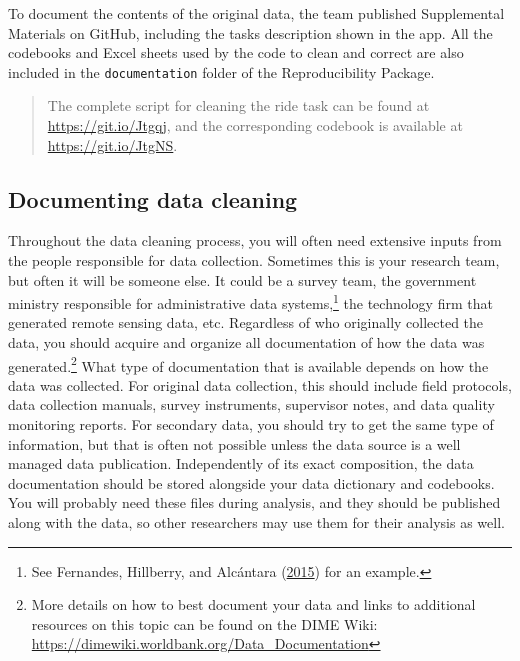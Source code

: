 \documentclass[
]{book}
\begin{document}
\begin{ex}
To document the contents of the original data, the team published Supplemental Materials on GitHub, including the tasks description shown in the app. All the codebooks and Excel sheets used by the code to clean and correct are also included in the \texttt{documentation} folder of the Reproducibility Package.

\begin{quote}
The complete script for cleaning the ride task can be found at \url{https://git.io/Jtgqj}, and the corresponding codebook is available at \url{https://git.io/JtgNS}.
\end{quote}
\end{ex}

\hypertarget{documenting-data-cleaning}{%
\subsection*{Documenting data cleaning}\label{documenting-data-cleaning}}

Throughout the data cleaning process,
you will often need extensive inputs from the people responsible for data collection.
Sometimes this is your research team, but often it will be someone else.
It could be a survey team, the government ministry responsible for administrative data systems,\footnote{See Fernandes, Hillberry, and Alcántara (\protect\hyperlink{ref-fernandes2015trade}{2015}) for an example.}
the technology firm that generated remote sensing data, etc.
Regardless of who originally collected the data,
you should acquire and organize all documentation of how the data was generated.\footnote{More details on how to best document your data and
  links to additional resources on this topic can be found on the DIME Wiki:
  \url{https://dimewiki.worldbank.org/Data_Documentation}}
What type of documentation that is available depends on how the data was collected.
For original data collection, this should include
field protocols, data collection manuals, survey instruments,
supervisor notes, and data quality monitoring reports.
For secondary data, you should try to get the same type of information,
but that is often not possible unless
the data source is a well managed data publication.
Independently of its exact composition,
the data documentation should be stored
alongside your data dictionary and codebooks.
You will probably need these files during analysis,
and they should be published along with the data,
so other researchers may use them for their analysis as well.
\end{document}
